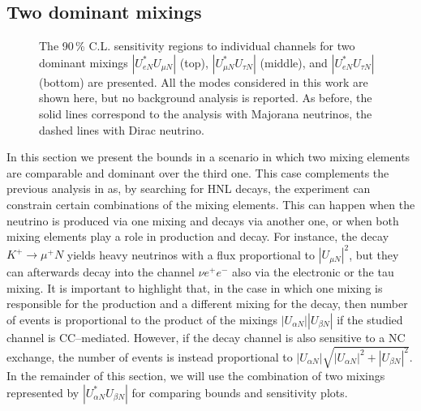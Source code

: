\subsection{Two dominant mixings}
\label{sec:bimax}

\begin{figure}
	\centering
	{\resizebox{\linewidth}{!}{}}
	\vspace{0.05em}

	{\resizebox{\linewidth}{!}{}}
	\vspace{0.05em}

	{\resizebox{\linewidth}{!}{}}
	\caption{The 90\,\% C.L. sensitivity regions to individual channels for two dominant mixings %
		$|U_{e N}^* U_{\mu N}|$ (top), $|U_{\mu N}^* U_{\tau N}|$ (middle), and $|U_{e N}^* U_{\tau N}|$ (bottom) are presented.
		All the modes considered in this work are shown here, but no background analysis is reported.
		As before, the solid lines correspond to the analysis with Majorana neutrinos, the dashed lines with Dirac neutrino.}
	\label{fig:senseMix}
\end{figure}

In this section we present the bounds in a scenario in which two mixing elements are comparable and dominant over the third one.
This case complements the previous analysis in  as, by searching for HNL decays, %
the experiment can constrain certain combinations of the mixing elements.
This can happen when the neutrino is produced via one mixing and decays via another one, %
or when both mixing elements play a role in production and decay.
For instance, the decay $K^+ \to \mu^+ N$ yields heavy neutrinos with a flux proportional to %
$|U_{\mu N}|^2$, but they can afterwards decay into the channel $\nu e^+ e^-$ also via the electronic or the tau mixing.
It is important to highlight that, in the case in which one mixing is responsible %
for the production and a different mixing for the decay, %
then number of events is proportional to the product of the mixings %
$|U_{\alpha N}||U_{\beta N}|$ if the studied channel is CC--mediated.
However, if the decay channel is also sensitive to a NC exchange, the number of events is instead proportional to %
$|U_{\alpha N}|\sqrt{|U_{\alpha N}|^2 + |U_{\beta N}|^2}$.
In the remainder of this section, we will use the combination of two mixings represented by $|U_{\alpha N}^* U_{\beta N}|$ %
\enlargethispage{\baselineskip}
for comparing bounds and sensitivity plots.

